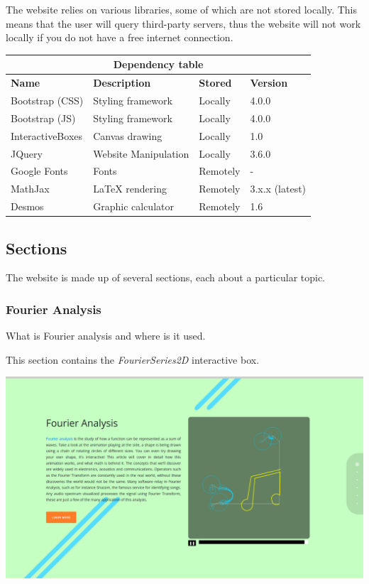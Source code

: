 \documentclass{article}
\begin{document}
The website relies on various libraries, some of which are not stored locally.
This means that the user will query third-party servers, thus the website will not work
locally if you do not have a free internet connection.

\medskip

\bgroup{}
\def\arraystretch{1.5}
\begin{center}
    \begin{tabular}{ |p{3cm}|p{4cm}|p{2cm}|p{2cm}| }
        \hline
        \multicolumn{4}{|c|}{\textbf{Dependency table}} \\
        \hline
        \textbf{Name} & \textbf{Description} & \textbf{Stored} & \textbf{Version} \\
        \hline
        Bootstrap (CSS) & Styling framework & Locally & 4.0.0 \\
        \hline
        Bootstrap (JS) & Styling framework & Locally & 4.0.0 \\
        \hline
        InteractiveBoxes & Canvas drawing & Locally & 1.0 \\
        \hline
        JQuery & Website Manipulation & Locally & 3.6.0 \\
        \hline
        Google Fonts & Fonts & Remotely & - \\
        \hline
        MathJax & LaTeX rendering & Remotely & 3.x.x (latest) \\
        \hline
        Desmos & Graphic calculator & Remotely & 1.6 \\
        \hline
    \end{tabular}
\end{center}
\egroup{}

\subsection{Sections}

The website is made up of several sections, each about a particular topic.

\subsubsection{Fourier Analysis}

What is Fourier analysis and where is it used. 

This section contains the \textit{FourierSeries2D} interactive box.

\includegraphics[width=\textwidth]{chap1.png}
\end{document}
